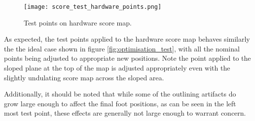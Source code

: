         \newpage
        \begin{figure}[h]
            \centering
            \texttt{[image: score\_test\_hardware\_points.png]}
            \caption{Test points on hardware score map.}
            \label{fig:hardware_test_points}
        \end{figure}

        \noindent
        As expected, the test points applied to the hardware score map behaves similarly the the ideal case shown in figure \ref{fig:optimisation_test},
        with all the nominal points being adjusted to appropriate new positions. Note the point applied to the sloped plane at the top of the map is adjusted
        appropriately even with the slightly undulating score map across the sloped area.

        Additionally, it should be noted that while some of the outlining artifacts do grow large enough to affect the final foot positions, as can be seen in the
        left most test point, these effects are generally not large enough to warrant concern.


